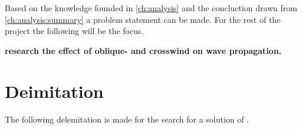 Based on the knowledge founded in \autoref{ch:analysis} and the concluction drawn from \autoref{ch:analysis:summary} a problem statement can be made. For the rest of the project the following will be the focus.


\textbf{research the effect of oblique- and crosswind on wave propagation.}

\section{Deimitation}
The following delemitation is made for the search for a solution of .